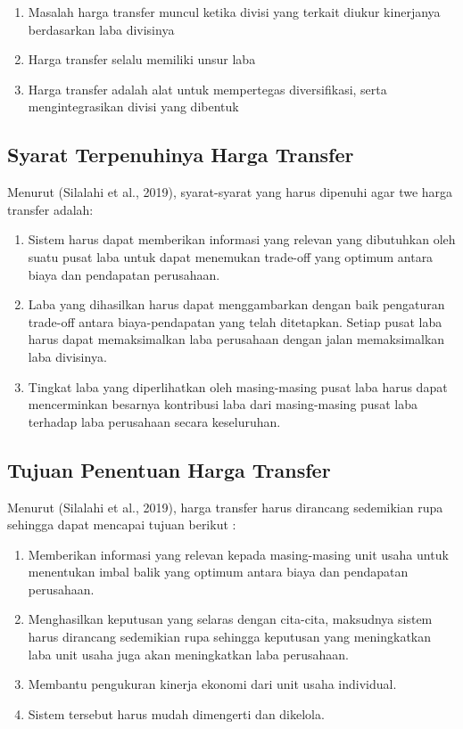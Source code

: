 \begin{enumerate}
	\item Masalah harga transfer muncul ketika divisi yang terkait diukur kinerjanya berdasarkan laba divisinya
	\item Harga transfer selalu memiliki unsur laba
	\item Harga transfer adalah alat untuk mempertegas diversifikasi, serta mengintegrasikan divisi yang dibentuk
\end{enumerate}
\subsection{Syarat Terpenuhinya Harga Transfer}

Menurut (Silalahi et al., 2019), syarat-syarat yang harus dipenuhi agar twe harga transfer adalah:

\begin{enumerate}
	\item Sistem harus dapat memberikan informasi yang relevan yang dibutuhkan oleh suatu pusat laba untuk dapat menemukan trade-off yang optimum antara biaya dan pendapatan perusahaan.
	\item Laba yang dihasilkan harus dapat menggambarkan dengan baik pengaturan trade-off antara biaya-pendapatan yang telah ditetapkan. Setiap pusat laba harus dapat memaksimalkan laba perusahaan dengan jalan memaksimalkan laba divisinya.
	\item Tingkat laba yang diperlihatkan oleh masing-masing pusat laba harus dapat mencerminkan besarnya kontribusi laba dari masing-masing pusat laba terhadap laba perusahaan secara keseluruhan.	
\end{enumerate}

\subsection{Tujuan Penentuan Harga Transfer}

Menurut (Silalahi et al., 2019), harga transfer harus dirancang sedemikian rupa sehingga dapat mencapai tujuan berikut :

\begin{enumerate}
	\item Memberikan informasi yang relevan kepada masing-masing unit usaha untuk menentukan imbal balik yang optimum antara biaya dan pendapatan perusahaan.
	\item Menghasilkan keputusan yang selaras dengan cita-cita, maksudnya sistem harus dirancang sedemikian rupa sehingga keputusan yang meningkatkan laba unit usaha juga akan meningkatkan laba perusahaan.
	\item Membantu pengukuran kinerja ekonomi dari unit usaha individual.
	\item Sistem tersebut harus mudah dimengerti dan dikelola.
\end{enumerate}

